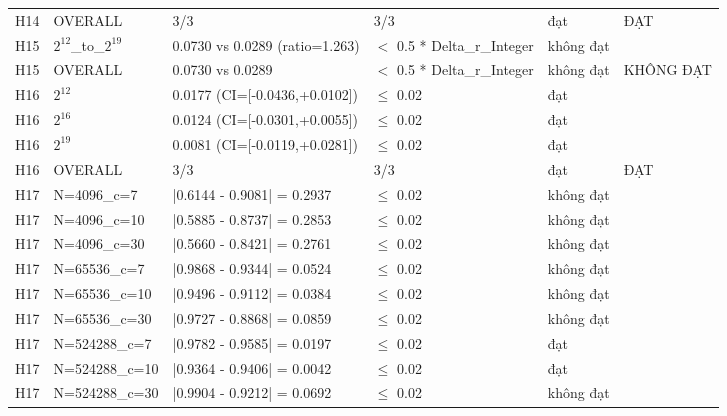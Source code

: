 \begin{longtable}{p{0.8cm}p{2.2cm}p{3.9cm}p{3.2cm}p{1.1cm}p{2.4cm}}
H14 & OVERALL & 3/3 & 3/3 & đạt & ĐẠT \\
H15 & $2^{12}$\_\allowbreak{}to\_\allowbreak{}$2^{19}$ & 0.0730 vs 0.0289 (ratio=\allowbreak{}1.263) & $<$\allowbreak{} 0.5 * Delta\_\allowbreak{}r\_\allowbreak{}Integer & không đạt &  \\
H15 & OVERALL & 0.0730 vs 0.0289 & $<$\allowbreak{} 0.5 * Delta\_\allowbreak{}r\_\allowbreak{}Integer & không đạt & KHÔNG ĐẠT \\
H16 & $2^{12}$ & 0.0177 (CI=\allowbreak{}[-0.0436,\allowbreak{}+0.0102]) & $\le$\allowbreak{} 0.02 & đạt &  \\
H16 & $2^{16}$ & 0.0124 (CI=\allowbreak{}[-0.0301,\allowbreak{}+0.0055]) & $\le$\allowbreak{} 0.02 & đạt &  \\
H16 & $2^{19}$ & 0.0081 (CI=\allowbreak{}[-0.0119,\allowbreak{}+0.0281]) & $\le$\allowbreak{} 0.02 & đạt &  \\
H16 & OVERALL & 3/3 & 3/3 & đạt & ĐẠT \\
H17 & N=\allowbreak{}4096\_\allowbreak{}c=\allowbreak{}7 & |0.6144 - 0.9081| =\allowbreak{} 0.2937 & $\le$\allowbreak{} 0.02 & không đạt &  \\
H17 & N=\allowbreak{}4096\_\allowbreak{}c=\allowbreak{}10 & |0.5885 - 0.8737| =\allowbreak{} 0.2853 & $\le$\allowbreak{} 0.02 & không đạt &  \\
H17 & N=\allowbreak{}4096\_\allowbreak{}c=\allowbreak{}30 & |0.5660 - 0.8421| =\allowbreak{} 0.2761 & $\le$\allowbreak{} 0.02 & không đạt &  \\
H17 & N=\allowbreak{}65536\_\allowbreak{}c=\allowbreak{}7 & |0.9868 - 0.9344| =\allowbreak{} 0.0524 & $\le$\allowbreak{} 0.02 & không đạt &  \\
H17 & N=\allowbreak{}65536\_\allowbreak{}c=\allowbreak{}10 & |0.9496 - 0.9112| =\allowbreak{} 0.0384 & $\le$\allowbreak{} 0.02 & không đạt &  \\
H17 & N=\allowbreak{}65536\_\allowbreak{}c=\allowbreak{}30 & |0.9727 - 0.8868| =\allowbreak{} 0.0859 & $\le$\allowbreak{} 0.02 & không đạt &  \\
H17 & N=\allowbreak{}524288\_\allowbreak{}c=\allowbreak{}7 & |0.9782 - 0.9585| =\allowbreak{} 0.0197 & $\le$\allowbreak{} 0.02 & đạt &  \\
H17 & N=\allowbreak{}524288\_\allowbreak{}c=\allowbreak{}10 & |0.9364 - 0.9406| =\allowbreak{} 0.0042 & $\le$\allowbreak{} 0.02 & đạt &  \\
H17 & N=\allowbreak{}524288\_\allowbreak{}c=\allowbreak{}30 & |0.9904 - 0.9212| =\allowbreak{} 0.0692 & $\le$\allowbreak{} 0.02 & không đạt &  \\

\end{longtable}
